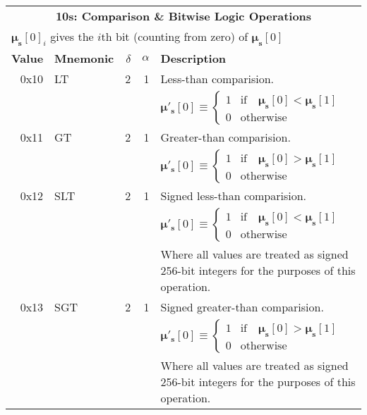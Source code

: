 \documentclass[9pt,oneside]{amsart}
\begin{document}
\begin{tabular*}{\columnwidth}[h]{rlrrl}
\toprule
\multicolumn{5}{c}{\textbf{10s: Comparison \& Bitwise Logic Operations}} \\
\multicolumn{5}{l}{$\boldsymbol{\mu}_\mathbf{s}[0]_i$ gives the $i$th bit (counting from zero) of $\boldsymbol{\mu}_\mathbf{s}[0]$} \vspace{5pt} \\
\textbf{Value} & \textbf{Mnemonic} & $\delta$ & $\alpha$ & \textbf{Description} \vspace{5pt} \\
0x10 & {\small LT} & 2 & 1 & Less-than comparision. \\
&&&& $\boldsymbol{\mu}'_\mathbf{s}[0] \equiv \begin{cases} 1 & \text{if} \quad \boldsymbol{\mu}_\mathbf{s}[0] < \boldsymbol{\mu}_\mathbf{s}[1] \\ 0 & \text{otherwise} \end{cases}$ \\
\midrule
0x11 & {\small GT} & 2 & 1 & Greater-than comparision. \\
&&&& $\boldsymbol{\mu}'_\mathbf{s}[0] \equiv \begin{cases} 1 & \text{if} \quad \boldsymbol{\mu}_\mathbf{s}[0] > \boldsymbol{\mu}_\mathbf{s}[1] \\ 0 & \text{otherwise} \end{cases}$ \\
\midrule
0x12 & {\small SLT} & 2 & 1 & Signed less-than comparision. \\
&&&& $\boldsymbol{\mu}'_\mathbf{s}[0] \equiv \begin{cases} 1 & \text{if} \quad \boldsymbol{\mu}_\mathbf{s}[0] < \boldsymbol{\mu}_\mathbf{s}[1] \\ 0 & \text{otherwise} \end{cases}$ \\
&&&& Where all values are treated as signed 256-bit integers for the purposes of this operation. \\
\midrule
0x13 & {\small SGT} & 2 & 1 & Signed greater-than comparision. \\
&&&& $\boldsymbol{\mu}'_\mathbf{s}[0] \equiv \begin{cases} 1 & \text{if} \quad \boldsymbol{\mu}_\mathbf{s}[0] > \boldsymbol{\mu}_\mathbf{s}[1] \\ 0 & \text{otherwise} \end{cases}$ \\
&&&& Where all values are treated as signed 256-bit integers for the purposes of this operation. \\

\end{tabular*}
\end{document}
